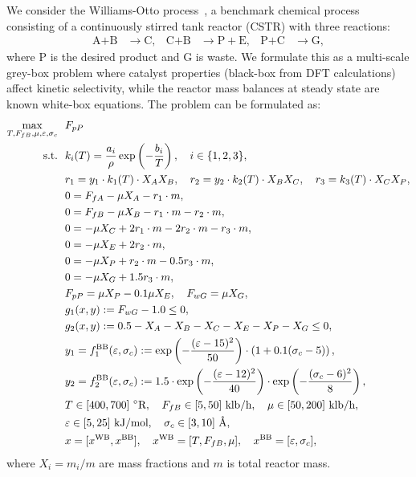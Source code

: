 \documentclass[12pt,a4paper]{article}%
\theoremstyle{plain}%
\theoremstyle{remark}%
\theoremstyle{definition}%
\def\WB{\mathrm{WB}}
\def\BB{\mathrm{BB}}
\begin{document}
\begin{appendices}
We consider the Williams-Otto process~\cite{williams1960,schmid2020}, a benchmark chemical process consisting of a continuously stirred tank reactor (CSTR) with three reactions:
\begin{align*}
    \text{A} + \text{B} &\to \text{C}, &
    \text{C} + \text{B} &\to \text{P} + \text{E}, &
    \text{P} + \text{C} &\to \text{G},
\end{align*}
where P is the desired product and G is waste. We formulate this as a multi-scale grey-box problem where catalyst properties (black-box from DFT calculations) affect kinetic selectivity, while the reactor mass balances at steady state are known white-box equations. The problem can be formulated as:
\begin{align} \label{eq:WilliamsOtto}
    \max_{T, F_{fB}, \mu, \varepsilon, \sigma_c} &~~ F_{pP} \\\notag
    \text{s.t.} &~~ k_i(T) = \frac{a_i}{\rho} \exp\left(-\frac{b_i}{T}\right), \quad i \in \{1, 2, 3\}, \\\notag
    &~~ r_1 = y_1 \cdot k_1(T) \cdot X_A X_B, \quad r_2 = y_2 \cdot k_2(T) \cdot X_B X_C, \quad r_3 = k_3(T) \cdot X_C X_P, \\\notag
    &~~ 0 = F_{fA} - \mu X_A - r_1 \cdot m, \\\notag
    &~~ 0 = F_{fB} - \mu X_B - r_1 \cdot m - r_2 \cdot m, \\\notag
    &~~ 0 = -\mu X_C + 2r_1 \cdot m - 2r_2 \cdot m - r_3 \cdot m, \\\notag
    &~~ 0 = -\mu X_E + 2r_2 \cdot m, \\\notag
    &~~ 0 = -\mu X_P + r_2 \cdot m - 0.5 r_3 \cdot m, \\\notag
    &~~ 0 = -\mu X_G + 1.5 r_3 \cdot m, \\\notag
    &~~ F_{pP} = \mu X_P - 0.1 \mu X_E, \quad F_{wG} = \mu X_G, \\\notag
    &~~ g_1(x, y) := F_{wG} - 1.0 \leq 0, \\\notag
    &~~ g_2(x, y) := 0.5 - X_A - X_B - X_C - X_E - X_P - X_G \leq 0, \\\notag
    &~~ y_1 = f^\BB_1(\varepsilon, \sigma_c) := \exp\left(-\frac{(\varepsilon - 15)^2}{50}\right) \cdot \left(1 + 0.1(\sigma_c - 5)\right), \\\notag
    &~~ y_2 = f^\BB_2(\varepsilon, \sigma_c) := 1.5 \cdot \exp\left(-\frac{(\varepsilon - 12)^2}{40}\right) \cdot \exp\left(-\frac{(\sigma_c - 6)^2}{8}\right), \\\notag
    &~~ T \in [400, 700]~^\circ\text{R}, \quad F_{fB} \in [5, 50]~\text{klb/h}, \quad \mu \in [50, 200]~\text{klb/h}, \\\notag
    &~~ \varepsilon \in [5, 25]~\text{kJ/mol}, \quad \sigma_c \in [3, 10]~\text{\AA}, \\\notag
    &~~ x = [x^{\WB}, x^{\BB}], \quad x^{\WB} = [T, F_{fB}, \mu], \quad x^{\BB} = [\varepsilon, \sigma_c],
\end{align}
where $X_i = m_i/m$ are mass fractions and $m$ is total reactor mass.


\end{appendices}
\end{document}
